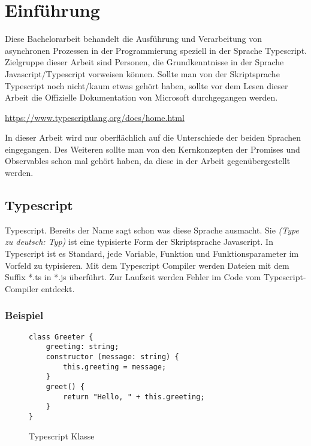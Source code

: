\setcounter{secnumdepth}{1}
\section{Einführung}
Diese Bachelorarbeit behandelt die Ausführung und Verarbeitung von asynchronen Prozessen in der Programmierung speziell in der Sprache Typescript.\\
Zielgruppe dieser Arbeit sind Personen, die Grundkenntnisse in der Sprache Javascript/Typescript vorweisen können.
Sollte man von der Skriptsprache Typescript noch nicht/kaum etwas gehört haben, sollte vor dem Lesen dieser Arbeit die Offizielle Dokumentation von Microsoft durchgegangen werden.

\begin{center}
\url{https://www.typescriptlang.org/docs/home.html} 
\end{center}

In dieser Arbeit wird nur oberflächlich auf die Unterschiede der beiden Sprachen eingegangen. Des Weiteren sollte man von den Kernkonzepten der Promises und Observables schon mal gehört haben, da diese in der Arbeit gegenübergestellt werden.

\subsection{Typescript}
Typescript. Bereits der Name sagt schon was diese Sprache ausmacht. Sie \textit{(\glqq{}Type\grqq{} zu deutsch: Typ)} ist eine typisierte Form der Skriptsprache Javascript. In Typescript ist es Standard, jede Variable, Funktion und Funktionsparameter im Vorfeld zu typisieren. Mit dem Typescript Compiler werden Dateien mit dem Suffix *.ts in *.js überführt. Zur Laufzeit werden Fehler im Code vom Typescript-Compiler entdeckt.

\subsubsection{Beispiel}

\begin{figure}[h!]
\begin{lstlisting}
class Greeter {
    greeting: string;
    constructor (message: string) {
        this.greeting = message;
    }
    greet() {
        return "Hello, " + this.greeting;
    }
}  
\end{lstlisting}
\caption{Typescript Klasse \cite{typescript-example}}
\end{figure}

